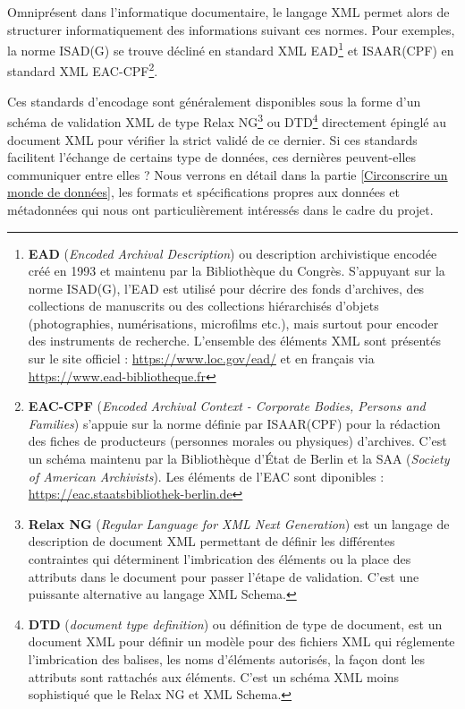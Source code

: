 Omniprésent dans l'informatique documentaire, le langage XML permet alors de structurer informatiquement des informations suivant ces normes. Pour exemples, la norme ISAD(G) se trouve décliné en standard XML EAD\footnote{\textbf{EAD} (\textit{Encoded Archival Description}) ou description archivistique encodée créé en 1993 et maintenu par la Bibliothèque du Congrès. S'appuyant sur la norme ISAD(G), l'EAD est utilisé pour décrire des fonds d'archives, des collections de manuscrits ou des collections hiérarchisés d'objets (photographies, numérisations, microfilms etc.), mais surtout pour encoder des instruments de recherche. L'ensemble des éléments XML sont présentés sur le site officiel : \url{https://www.loc.gov/ead/} et en français via \url{https://www.ead-bibliotheque.fr}} et ISAAR(CPF) en standard XML EAC-CPF\footnote{\textbf{EAC-CPF} (\textit{Encoded Archival Context - Corporate Bodies, Persons and Families}) s'appuie sur la norme définie par ISAAR(CPF) pour la rédaction des fiches de producteurs (personnes morales ou physiques) d'archives. C'est un schéma maintenu par la Bibliothèque d'État de Berlin et la SAA (\textit{Society of American Archivists}). Les éléments de l'EAC sont diponibles : \url{https://eac.staatsbibliothek-berlin.de}}.

Ces standards d'encodage sont généralement disponibles sous la forme d'un schéma de validation XML de type Relax NG\footnote{\textbf{Relax NG} (\textit{Regular Language for XML Next Generation}) est un langage de description de document XML permettant de définir les différentes contraintes qui déterminent l'imbrication des éléments ou la place des attributs dans le document pour passer l'étape de validation. C'est une puissante alternative au langage XML Schema.} ou DTD\footnote{\textbf{DTD} (\textit{document type definition}) ou définition de type de document, est un document XML pour définir un modèle pour des fichiers XML qui réglemente l'imbrication des balises, les noms d'éléments autorisés, la façon dont les attributs sont rattachés aux éléments. C'est un schéma XML moins sophistiqué que le Relax NG et XML Schema.} directement épinglé au document XML pour vérifier la strict validé de ce dernier. 
Si ces standards facilitent l'échange de certains type de données, ces dernières peuvent-elles communiquer entre elles ? Nous verrons en détail dans la partie \ref{Circonscrire un monde de données}, les formats et spécifications propres aux données et métadonnées qui nous ont particulièrement intéressés dans le cadre du projet.\\ 

